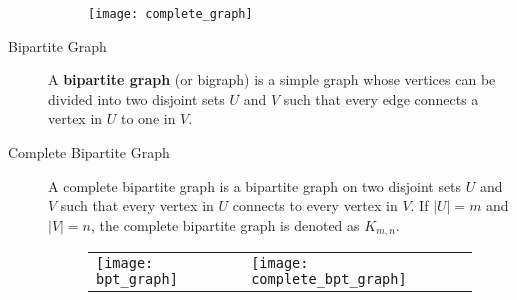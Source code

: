 \documentclass{article}
\begin{document}
\begin{description}
    \begin{figure}[H]
		\centering
		\texttt{[image: complete\_graph]} 
	\end{figure}
	
    \item[\ding{73} Bipartite Graph] A \textbf{bipartite graph} (or bigraph) is a simple graph whose vertices can be divided into two disjoint sets $U$ and $V$ such that every edge connects a vertex in $U$ to one in $V$.
    \item[Complete Bipartite Graph] A complete bipartite graph is a bipartite graph on two disjoint sets $U$ and $V$ such that every vertex in $U$ connects to every vertex in $V$. If $|U|=m$ and $|V|=n$, the complete bipartite graph is denoted as $K_{m, n}$.
    
    \begin{figure}[H]
		\centering
		\begin{tabular}{ll}
			\texttt{[image: bpt\_graph]} & \texttt{[image: complete\_bpt\_graph]} \\
		\end{tabular}
	\end{figure}
    

\end{description}
\end{document}

